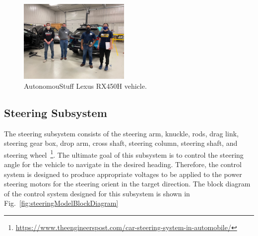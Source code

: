 \documentclass[journal,twoside,web]{ieeecolor}
\begin{document}
% 
\begin{figure}[htbp]
	\centering
	\includegraphics[height=4cm]{figs/img/picturesVisitToAStuff/visitors1-20211007}
	\caption{AutonomouStuff Lexus RX450H vehicle.}
	\label{fig:lexusvehicle}
\end{figure}

\subsection{Steering Subsystem}
\label{sec:steeringSubsystem}

The steering subsystem consists of the steering arm, knuckle, rods, drag link, steering gear box, drop arm, cross shaft, steering column, steering shaft, and steering wheel~\footnote{\url{https://www.theengineerspost.com/car-steering-system-in-automobile/}}. The ultimate goal of this subsystem is to control the steering angle for the vehicle to navigate in the desired heading. Therefore, the control system is designed to produce appropriate voltages to be applied to the power steering motors for the steering orient in the target direction. The block diagram of the control system designed for this subsystem is shown in Fig.~\ref{fig:steeringModelBlockDiagram}
\end{document}
